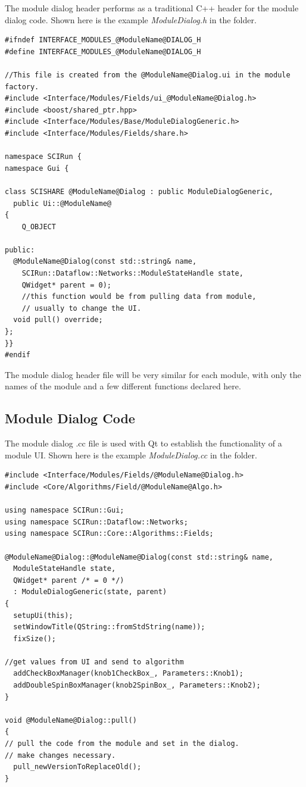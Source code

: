 \documentclass[fleqn,11pt,openany]{book}
\begin{document}
The module dialog header performs as a traditional C++ header for the module dialog code.  
Shown here is the example \emph{ModuleDialog.h} in the \emph{} folder.

\begin{verbatim}
#ifndef INTERFACE_MODULES_@ModuleName@DIALOG_H
#define INTERFACE_MODULES_@ModuleName@DIALOG_H

//This file is created from the @ModuleName@Dialog.ui in the module factory. 
#include <Interface/Modules/Fields/ui_@ModuleName@Dialog.h>
#include <boost/shared_ptr.hpp>
#include <Interface/Modules/Base/ModuleDialogGeneric.h>
#include <Interface/Modules/Fields/share.h>

namespace SCIRun {
namespace Gui {
  
class SCISHARE @ModuleName@Dialog : public ModuleDialogGeneric,
  public Ui::@ModuleName@
{
	Q_OBJECT
	
public:
  @ModuleName@Dialog(const std::string& name,
    SCIRun::Dataflow::Networks::ModuleStateHandle state,
    QWidget* parent = 0);
    //this function would be from pulling data from module, 
    // usually to change the UI. 
  void pull() override;
};
}}
#endif
\end{verbatim}

The module dialog header file will be very similar for each module, with only the names of the module and a few different functions declared here.  


\subsection{Module Dialog Code}

The module dialog .cc file is used with Qt to establish the functionality of a module UI.  
Shown here is the example \emph{ModuleDialog.cc} in the \emph{} folder.
\begin{verbatim}
#include <Interface/Modules/Fields/@ModuleName@Dialog.h>
#include <Core/Algorithms/Field/@ModuleName@Algo.h>

using namespace SCIRun::Gui;
using namespace SCIRun::Dataflow::Networks;
using namespace SCIRun::Core::Algorithms::Fields;

@ModuleName@Dialog::@ModuleName@Dialog(const std::string& name, 
  ModuleStateHandle state,
  QWidget* parent /* = 0 */)
  : ModuleDialogGeneric(state, parent)
{
  setupUi(this);
  setWindowTitle(QString::fromStdString(name));
  fixSize();

//get values from UI and send to algorithm 
  addCheckBoxManager(knob1CheckBox_, Parameters::Knob1);
  addDoubleSpinBoxManager(knob2SpinBox_, Parameters::Knob2);
}

void @ModuleName@Dialog::pull()
{
// pull the code from the module and set in the dialog. 
// make changes necessary.
  pull_newVersionToReplaceOld();
}
\end{verbatim}
\end{document}
